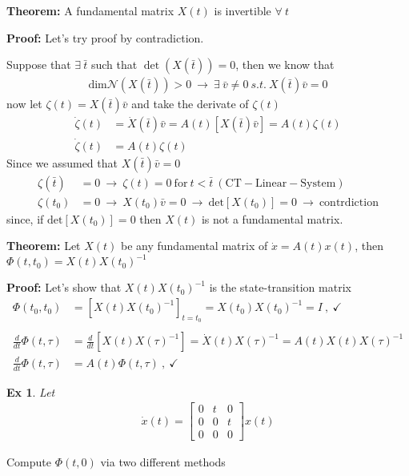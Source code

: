 \documentclass[twoside]{article}
\newtheorem{exmp}[theorem]{Ex}
\begin{document}
\textbf{Theorem:} A fundamental matrix $X(t)$ is invertible $\forall \ t$

\textbf{Proof:} Let's try proof by contradiction. 

Suppose that $\exists \ \bar{t}$ such that $\det( X(\bar{t}) ) = 0$, then we know that 
%
\begin{align*}
	\mathrm{dim} \mathcal{N}\left( X(\bar{t}) \right) > 0 \ \rightarrow \ \exists \ \bar{v}\neq0 \ s.t. \ X(\bar{t}) \bar{v} = 0
\end{align*}
%
now let $\zeta(t) = X(\bar{t}) \bar{v}$ and take the derivate of $\zeta(t)$
%
\begin{align*}
	\dot{\zeta}(t) &= \dot{X}(\bar{t}) \bar{v} = A(t) \left[ X(\bar{t}) \bar{v} \right] = A(t) \zeta(t)
	\\
	\dot{\zeta}(t) &= A(t) \zeta(t)
\end{align*}
%
Since we assumed that $X(\bar{t}) \bar{v} = 0$
%
\begin{align*}
	\zeta(\bar{t}) &= 0 \ \rightarrow \ \zeta(t) = 0 \ \mathrm{for} \ t < \bar{t} \ \mathrm{(CT-Linear-System)}
	\\
	\zeta(t_0) &= 0 \ \rightarrow \ X(t_0) \bar{v} = 0 \ \rightarrow \ \mathrm{det}[X(t_0)]=0 \ \rightarrow \ \mathrm{contrdiction}
\end{align*}
%
since, if $\mathrm{det}[X(t_0)]=0$ then $X(t)$ is not a fundamental matrix. 

\vspace{6pt}

\textbf{Theorem:} Let $X(t)$ be any fundamental matrix of $\dot{x} = A(t) x(t)$, then $\Phi(t,t_0) = X(t) X(t_0)^{-1}$

\textbf{Proof:} Let's show that $X(t) X(t_0)^{-1}$ is the state-transition matrix
%
\begin{align*}
\Phi(t_0,t_0) &= \left[ X(t) X(t_0)^{-1} \right]_{t=t_0} = X(t_0) X(t_0)^{-1}= I \ , \ \checkmark
	\\
	\\
	\frac{d}{dt} \Phi(t , \tau) &= \frac{d}{dt} \left[ X(t) X(\tau)^{-1} \right] = \dot{X}(t) X(\tau)^{-1}  = A(t) X(t) X(\tau)^{-1}
	\\
	\frac{d}{dt} \Phi(t , \tau) &= A(t) \Phi(t , \tau) \ , \ \checkmark
\end{align*}

\begin{exmp}
Let 
\begin{align*}
	\dot{x}(t) = \begin{bmatrix} 0 & t & 0 \\ 0 & 0 & t \\ 0 & 0 & 0 \end{bmatrix} x(t)
\end{align*}
\end{exmp}
%
Compute $\Phi(t,0)$ via two different methods
\end{document}
